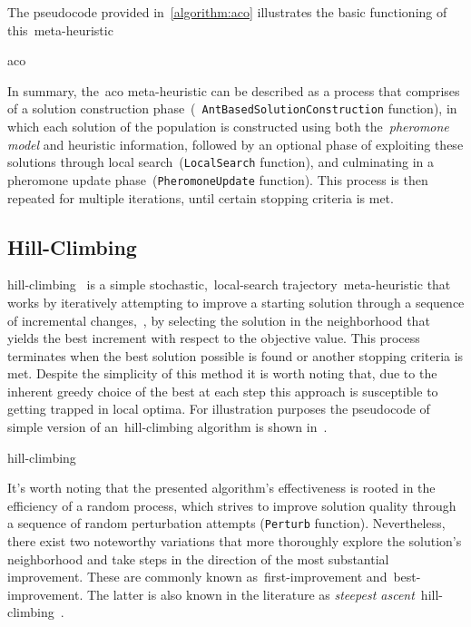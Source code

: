 The pseudocode provided in~\ref{algorithm:aco} illustrates the basic functioning
of this~\acrshort{meta-heuristic}

\begin{algorithm}
  
  \caption{\acrlong{aco}}
  \label{algorithm:aco}
\end{algorithm}

In summary, the~\acrshort{aco} meta-heuristic can be described as a process that
comprises of a solution construction
phase~(~\texttt{AntBasedSolutionConstruction} function), in which each solution
of the population is constructed using both the~\textit{pheromone model} and
heuristic information, followed by an optional phase of exploiting these
solutions through local search~(\texttt{LocalSearch} function), and culminating
in a pheromone update phase~(\texttt{PheromoneUpdate} function). This process is
then repeated for multiple iterations, until certain stopping criteria is met.

\subsection{Hill-Climbing}
\label{subsec:hill-climbing}

\acrfull{hill-climbing}~\cite{luke2013essentialsa,vieira2009uma} is a simple
stochastic,~\acrshort{local-search} trajectory~\acrshort{meta-heuristic} that
works by iteratively attempting to improve a starting solution through a
sequence of incremental changes,~\ie{}, by selecting the solution in the
neighborhood that yields the best increment with respect to the objective value.
This process terminates when the best solution possible is found or another
stopping criteria is met. Despite the simplicity of this method it is worth
noting that, due to the inherent greedy choice of the best at each step this
approach is susceptible to getting trapped in local optima. For illustration
purposes the pseudocode of simple version of an~\acrshort{hill-climbing}
algorithm is shown in~.

\begin{algorithm}
  
  \caption{\acrlong{hill-climbing}}
  \label{algorithm:hill-climbing}
\end{algorithm}

It's worth noting that the presented algorithm's effectiveness is rooted in the
efficiency of a random process, which strives to improve solution quality
through a sequence of random perturbation attempts (\texttt{Perturb} function).
Nevertheless, there exist two noteworthy variations that more thoroughly explore
the solution's neighborhood and take steps in the direction of the most
substantial improvement. These are commonly known as~\acrfull{first-improvement}
and~\acrfull{best-improvement}. The latter is also known in the literature as
\textit{steepest ascent}~\acrshort{hill-climbing}~\cite{luke2013essentialsa}.

